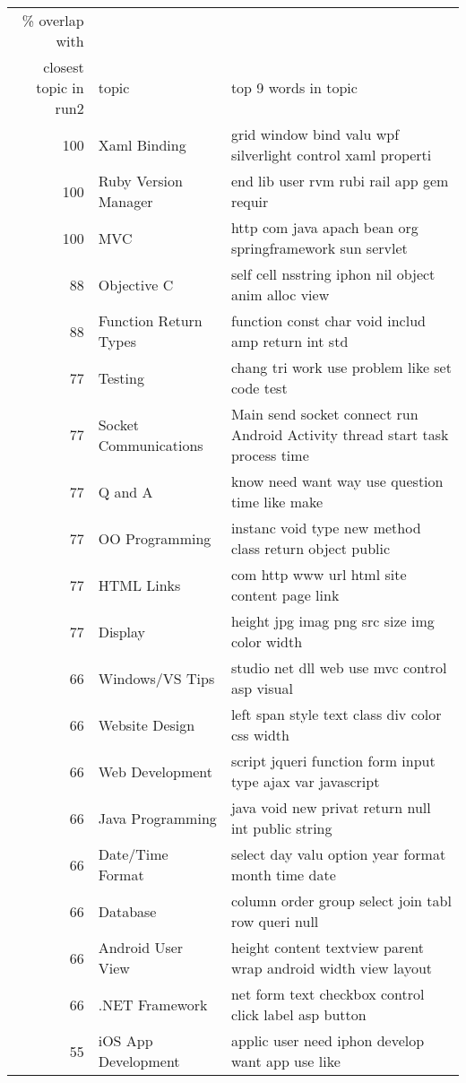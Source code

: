 \begin{figure*}[!t]
\renewcommand{\baselinestretch}{0.75}
\begin{center}
\footnotesize
\begin{tabular}{r|l|l}
\% overlap with & &\\
closest topic in run2  & topic & top 9 words in topic\\\hline
100 &Xaml Binding & grid window bind valu wpf silverlight control xaml properti\\
100 &Ruby Version Manager & end lib user rvm rubi rail app gem requir\\
100 &MVC & http com java apach bean org springframework sun servlet\\
88 &Objective C & self cell nsstring iphon nil object anim alloc view\\
88 &Function Return Types & function const char void includ amp return int std\\
77 &Testing & chang tri work use problem like set code test\\
77 &Socket Communications & Main send socket connect run Android Activity thread start task process time\\
77 &Q and A & know need want way use question time like make\\
77 &OO Programming & instanc void type new method class return object public\\
77 &HTML Links & com http www url html site content page link\\
77 &Display & height jpg imag png src size img color width\\
66 &Windows/VS Tips & studio net dll web use mvc control asp visual\\
66 &Website Design & left span style text class div color css width\\
66 &Web Development & script jqueri function form input type ajax var javascript\\
66 &Java Programming & java void new privat return null int public string\\
66 &Date/Time Format & select day valu option year format month time date\\
66 &Database & column order group select join tabl row queri null\\
66 &Android User View & height content textview parent wrap android width view layout\\
66 &.NET Framework & net form text checkbox control click label asp button\\
55 &iOS App Development & applic user need iphon develop want app use like\\

\end{tabular}
\end{center}
\end{figure*}
